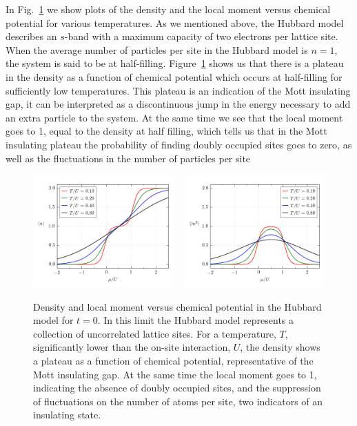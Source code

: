 In Fig.~\ref{fig:0t_occupation} we show plots of the density and the local
moment versus chemical potential for various temperatures.  As we mentioned
above, the Hubbard model describes an $s$-band with a maximum capacity of two
electrons per lattice site.   When the average number of particles per site in
the Hubbard model  is $n=1$, the system is said to be at half-filling.
Figure~\ref{fig:0t_occupation} shows us that there is a plateau in the density
as a function of chemical potential which occurs at half-filling for
sufficiently low temperatures.   This plateau is an indication of the Mott
insulating gap, it can be interpreted as a discontinuous jump in the energy
necessary to add an extra particle to the system.   At the same time we see
that the local moment goes to 1, equal to the density at half filling, which
tells us that in the Mott insulating plateau the probability of finding doubly
occupied sites goes to zero, as well as the fluctuations in the number of
particles per site 
\begin{figure}
\centering
\includegraphics[width=0.48\textwidth]{../figures/hubbard/hubbard_0t_occupation.png}
~
\includegraphics[width=0.48\textwidth]{../figures/hubbard/hubbard_0t_moments.png}
\caption[Density and local moment in the Hubbard model at $t=0$]{\small Density
and local moment versus chemical potential in the Hubbard model for $t=0$.  In
this limit the Hubbard model represents a collection of uncorrelated lattice
sites.  For a temperature, $T$, significantly lower than the on-site
interaction, $U$,  the density shows a plateau as a function of chemical
potential, representative of the Mott insulating gap. At the same time the
local moment goes to 1, indicating the absence of doubly occupied sites, and
the suppression of fluctuations on the number of atoms per site, two indicators
of an insulating state.  } 
\label{fig:0t_occupation}
\end{figure}

